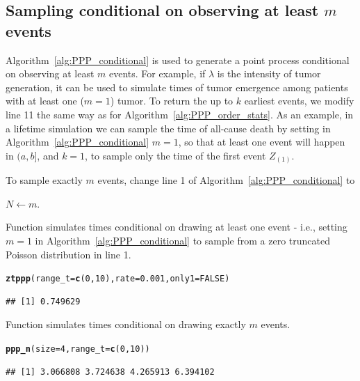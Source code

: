 \documentclass[article,nojss]{jss}\usepackage[]{graphicx}\usepackage[]{xcolor}
\makeatletter
\newcommand{\hlnum}[1]{\textcolor[rgb]{0.686,0.059,0.569}{#1}}%
\newcommand{\hlstd}[1]{\textcolor[rgb]{0.345,0.345,0.345}{#1}}%
\newcommand{\hlkwc}[1]{\textcolor[rgb]{0.333,0.667,0.333}{#1}}%
\newcommand{\hlkwd}[1]{\textcolor[rgb]{0.737,0.353,0.396}{\textbf{#1}}}%
\newenvironment{kframe}{%
 \def\at@end@of@kframe{}%
 \ifinner\ifhmode%
  \def\at@end@of@kframe{\end{minipage}}%
  \begin{minipage}{\columnwidth}%
 \fi\fi%
 \def\FrameCommand##1{\hskip\@totalleftmargin \hskip-\fboxsep
 \colorbox{shadecolor}{##1}\hskip-\fboxsep
     \hskip-\linewidth \hskip-\@totalleftmargin \hskip\columnwidth}%
 \MakeFramed {\advance\hsize-\width
   \@totalleftmargin\z@ \linewidth\hsize
   \@setminipage}}%
 {\par\unskip\endMakeFramed%
 \at@end@of@kframe}
\newenvironment{knitrout}{}{} %
\newcommand{\fct}[1]{\code{#1()}}
\makeatother
\begin{document}
\subsection{Sampling conditional on observing at least $m$ events}\label{sec:PPP_order_stats}



Algorithm~\ref{alg:PPP_conditional} is used to generate a point process conditional on observing at least $m$ events. For example, if $\lambda$ is the intensity of tumor generation, it can be used to simulate times of tumor emergence among patients with at least one ($m=1$) tumor. To return the up to $k$ earliest events, we modify line 11 the same way as for Algorithm~\ref{alg:PPP_order_stats}. As an example, in a lifetime simulation we can sample the time of all-cause death by setting in Algorithm~\ref{alg:PPP_conditional} $m=1$, so that at least one event will happen in $(a, b]$, and $k = 1$, to sample only the time of the first event $Z_{(1)}$.

To sample exactly $m$ events, change line 1 of Algorithm~\ref{alg:PPP_conditional} to
\begin{center}
$N \gets m$.
\end{center}

Function \fct{ztppp} simulates times conditional on drawing at least one event - i.e., setting $m=1$ in Algorithm~\ref{alg:PPP_conditional} to sample from a zero truncated Poisson distribution in line 1.
\begin{knitrout}
\color{fgcolor}\begin{kframe}
\begin{alltt}
\hlkwd{ztppp}\hlstd{(}\hlkwc{range_t} \hlstd{=} \hlkwd{c}\hlstd{(}\hlnum{0}\hlstd{,} \hlnum{10}\hlstd{),} \hlkwc{rate} \hlstd{=} \hlnum{0.001}\hlstd{,} \hlkwc{only1} \hlstd{=} \hlnum{FALSE}\hlstd{)}
\end{alltt}
\begin{verbatim}
## [1] 0.749629
\end{verbatim}
\end{kframe}
\end{knitrout}

Function \fct{ppp\_n} simulates times conditional on drawing exactly $m$ events.
\begin{knitrout}
\color{fgcolor}\begin{kframe}
\begin{alltt}
\hlkwd{ppp_n}\hlstd{(}\hlkwc{size} \hlstd{=} \hlnum{4}\hlstd{,} \hlkwc{range_t} \hlstd{=} \hlkwd{c}\hlstd{(}\hlnum{0}\hlstd{,} \hlnum{10}\hlstd{))}
\end{alltt}
\begin{verbatim}
## [1] 3.066808 3.724638 4.265913 6.394102
\end{verbatim}
\end{kframe}
\end{knitrout}
\end{document}
